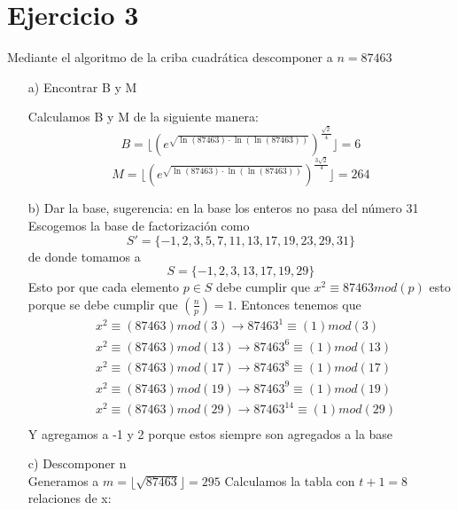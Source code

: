 \documentclass[12pt, letterpaper]{article}
\begin{document}
\section*{Ejercicio 3}
Mediante el algoritmo de la criba cuadrática descomponer a $n = 87463$
\begin{itemize}
\item[a)] Encontrar B y M

Calculamos B y M de la siguiente manera:
\[B = \lfloor (e^{\sqrt{\ln(87463)\cdot\ln(\ln(87463))}} )^{\frac{\sqrt{2}}{4}}                  \rfloor = 6\]
\[M = \lfloor (e^{\sqrt{\ln(87463)\cdot\ln(\ln(87463))}} )^{\frac{3\sqrt{2}}{4}}                  \rfloor = 264\]

\item[b)] Dar la base, sugerencia: en la base los enteros no pasa del número 31
Escogemos la base de factorización como \[S' = \{-1,2,3,5,7,11,13,17,19,23,29,31\}\] 
de donde tomamos a \[S = \{-1,2,3,13,17,19,29\}\]
Esto por que cada elemento $p \in S$ debe cumplir que $x^2 \equiv 87463 mod (p)$ esto porque se debe cumplir que $\left( \frac{n}{p} \right)= 1$. Entonces tenemos que
\begin{equation*}
\begin{split}
&x^2 \equiv (87463) mod (3) \rightarrow 87463^1 \equiv (1) mod (3)\\
&x^2 \equiv (87463) mod (13) \rightarrow 87463^6 \equiv (1) mod (13)\\
&x^2 \equiv (87463) mod (17) \rightarrow 87463^8 \equiv (1) mod (17)\\
&x^2 \equiv (87463) mod (19) \rightarrow 87463^9 \equiv (1) mod (19)\\
&x^2 \equiv (87463) mod (29) \rightarrow 87463^{14} \equiv (1) mod (29)\\
\end{split}
\end{equation*}
Y agregamos a -1 y 2 porque estos siempre son agregados a la base

\item[c)] Descomponer n\\
Generamos a $m = \lfloor \sqrt{87463} \rfloor = 295$
Calculamos la tabla con $t+1 = 8$ relaciones de x:

\begin{center}


\end{center}
\end{itemize}
\end{document}
